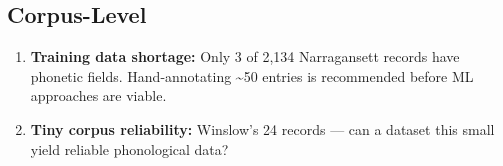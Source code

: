 \subsection{Corpus-Level}

\begin{enumerate}
  \item \textbf{Training data shortage:} Only 3 of 2,134 Narragansett records
    have phonetic fields. Hand-annotating \textasciitilde50 entries is
    recommended before ML approaches are viable.
  \item \textbf{Tiny corpus reliability:} Winslow's 24 records --- can a
    dataset this small yield reliable phonological data?
\end{enumerate}
